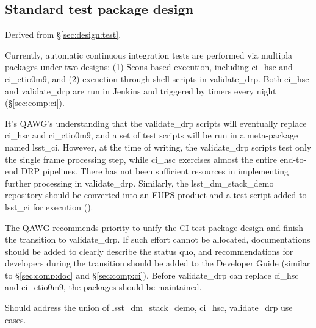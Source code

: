 \subsection{Standard test package design}

Derived from \S\ref{sec:design:test}.


Currently, automatic continuous integration tests are performed via
multipla packages under two designs: (1) Scons-based execution, including
ci\_hsc and ci\_ctio0m9, and (2) exeuction through shell scripts
in validate\_drp.  Both ci\_hsc and validate\_drp are run in
Jenkins and triggered by timers every night (\S\ref{sec:comp:ci}).

It's QAWG's understanding that the validate\_drp scripts will
eventually replace ci\_hsc and ci\_ctio0m9, and a set of test scripts
will be run in a meta-package named lsst\_ci.  However, at the time
of writing, the validate\_drp scripts test only the single frame
processing step, while ci\_hsc exercises almost the entire end-to-end
DRP pipelines.  There has not been sufficient resources in implementing
further processing in validate\_drp.  Similarly, the lsst\_dm\_stack\_demo
repository should be converted into an EUPS product and a test
script added to lsst\_ci for execution ().

The QAWG recommends priority to unify the CI test package design and
finish the transition to validate\_drp. If such effort cannot
be allocated, documentations should be added to clearly describe
the status quo, and recommendations for developers during the
transition should be added to the Developer Guide (similar to
\S\ref{sec:comp:doc} and \S\ref{sec:comp:ci}). Before validate\_drp
can replace ci\_hsc and ci\_ctio0m9, the packages should be maintained.


Should address the union of lsst\_dm\_stack\_demo, ci\_hsc, validate\_drp use
cases.

